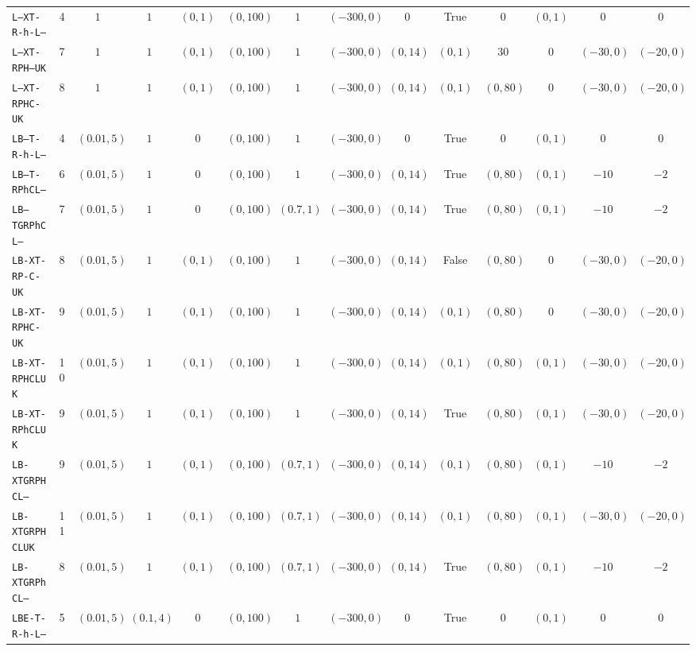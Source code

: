 {\begin{tabular}{l c c c c c c c c c c c c c }
\texttt{L--XT-R-h-L--} & 4 & $1$ & $1$ & $(0, 1)$ & $(0, 100)$ & $1$ & $(-300, 0)$ & $0$ & \textrm{True} & $0$ & $(0, 1)$ & $0$ & $0$ \\
\texttt{L--XT-RPH--UK} & 7 & $1$ & $1$ & $(0, 1)$ & $(0, 100)$ & $1$ & $(-300, 0)$ & $(0, 14)$ & $(0, 1)$ & $30$ & $0$ & $(-30, 0)$ & $(-20, 0)$ \\
\texttt{L--XT-RPHC-UK} & 8 & $1$ & $1$ & $(0, 1)$ & $(0, 100)$ & $1$ & $(-300, 0)$ & $(0, 14)$ & $(0, 1)$ & $(0, 80)$ & $0$ & $(-30, 0)$ & $(-20, 0)$ \\
\texttt{LB--T-R-h-L--} & 4 & $(0.01, 5)$ & $1$ & $0$ & $(0, 100)$ & $1$ & $(-300, 0)$ & $0$ & \textrm{True} & $0$ & $(0, 1)$ & $0$ & $0$ \\
\texttt{LB--T-RPhCL--} & 6 & $(0.01, 5)$ & $1$ & $0$ & $(0, 100)$ & $1$ & $(-300, 0)$ & $(0, 14)$ & \textrm{True} & $(0, 80)$ & $(0, 1)$ & $-10$ & $-2$ \\
\texttt{LB--TGRPhCL--} & 7 & $(0.01, 5)$ & $1$ & $0$ & $(0, 100)$ & $(0.7, 1)$ & $(-300, 0)$ & $(0, 14)$ & \textrm{True} & $(0, 80)$ & $(0, 1)$ & $-10$ & $-2$ \\
\texttt{LB-XT-RP-C-UK} & 8 & $(0.01, 5)$ & $1$ & $(0, 1)$ & $(0, 100)$ & $1$ & $(-300, 0)$ & $(0, 14)$ & \textrm{False} & $(0, 80)$ & $0$ & $(-30, 0)$ & $(-20, 0)$ \\
\texttt{LB-XT-RPHC-UK} & 9 & $(0.01, 5)$ & $1$ & $(0, 1)$ & $(0, 100)$ & $1$ & $(-300, 0)$ & $(0, 14)$ & $(0, 1)$ & $(0, 80)$ & $0$ & $(-30, 0)$ & $(-20, 0)$ \\
\texttt{LB-XT-RPHCLUK} & 10 & $(0.01, 5)$ & $1$ & $(0, 1)$ & $(0, 100)$ & $1$ & $(-300, 0)$ & $(0, 14)$ & $(0, 1)$ & $(0, 80)$ & $(0, 1)$ & $(-30, 0)$ & $(-20, 0)$ \\
\texttt{LB-XT-RPhCLUK} & 9 & $(0.01, 5)$ & $1$ & $(0, 1)$ & $(0, 100)$ & $1$ & $(-300, 0)$ & $(0, 14)$ & \textrm{True} & $(0, 80)$ & $(0, 1)$ & $(-30, 0)$ & $(-20, 0)$ \\
\texttt{LB-XTGRPHCL--} & 9 & $(0.01, 5)$ & $1$ & $(0, 1)$ & $(0, 100)$ & $(0.7, 1)$ & $(-300, 0)$ & $(0, 14)$ & $(0, 1)$ & $(0, 80)$ & $(0, 1)$ & $-10$ & $-2$ \\
\texttt{LB-XTGRPHCLUK} & 11 & $(0.01, 5)$ & $1$ & $(0, 1)$ & $(0, 100)$ & $(0.7, 1)$ & $(-300, 0)$ & $(0, 14)$ & $(0, 1)$ & $(0, 80)$ & $(0, 1)$ & $(-30, 0)$ & $(-20, 0)$ \\
\texttt{LB-XTGRPhCL--} & 8 & $(0.01, 5)$ & $1$ & $(0, 1)$ & $(0, 100)$ & $(0.7, 1)$ & $(-300, 0)$ & $(0, 14)$ & \textrm{True} & $(0, 80)$ & $(0, 1)$ & $-10$ & $-2$ \\
\texttt{LBE-T-R-h-L--} & 5 & $(0.01, 5)$ & $(0.1, 4)$ & $0$ & $(0, 100)$ & $1$ & $(-300, 0)$ & $0$ & \textrm{True} & $0$ & $(0, 1)$ & $0$ & $0$ \\

\end{tabular}}
